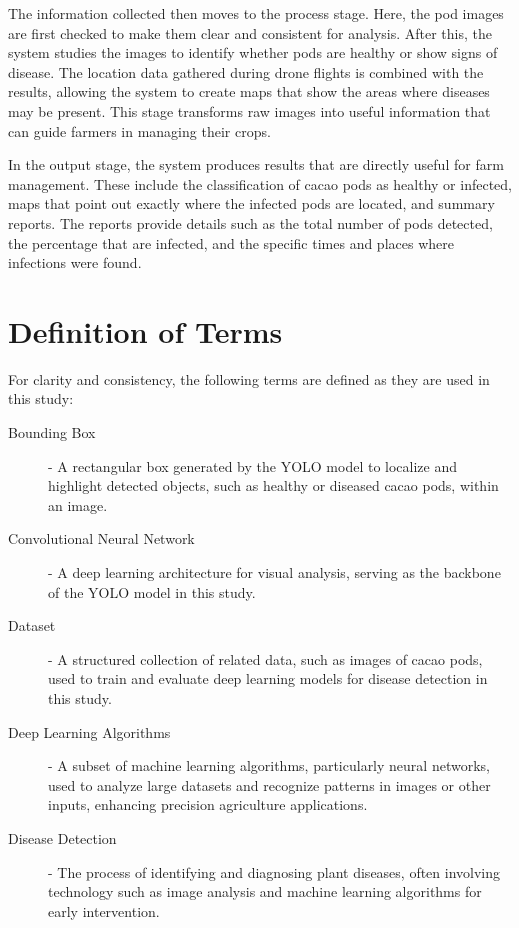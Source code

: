 {The information collected then moves to the process stage. Here, the pod images are first checked to make them clear and consistent for analysis. After this, the system studies the images to identify whether pods are healthy or show signs of disease. The location data gathered during drone flights is combined with the results, allowing the system to create maps that show the areas where diseases may be present. This stage transforms raw images into useful information that can guide farmers in managing their crops.

In the output stage, the system produces results that are directly useful for farm management. These include the classification of cacao pods as healthy or infected, maps that point out exactly where the infected pods are located, and summary reports. The reports provide details such as the total number of pods detected, the percentage that are infected, and the specific times and places where infections were found.


\section{Definition of Terms}

For clarity and consistency, the following terms are defined as they are used in this study:

\begin{description}
	\item[Bounding Box] - A rectangular box generated by the YOLO model to localize and highlight detected objects, such as healthy or diseased cacao pods, within an image.
	
	\item[Convolutional Neural Network] - A deep learning architecture for visual analysis, serving as the backbone of the YOLO model in this study.
	
	
	\item[Dataset] - A structured collection of related data, such as images of cacao pods, used to train and evaluate deep learning models for disease detection in this study.

	\item[Deep Learning Algorithms] - A subset of machine learning algorithms, particularly neural networks, used to analyze large datasets and recognize patterns in images or other inputs, enhancing precision agriculture applications.

	\item[Disease Detection] - The process of identifying and diagnosing plant diseases, often involving technology such as image analysis and machine learning algorithms for early intervention.


\end{description}}
